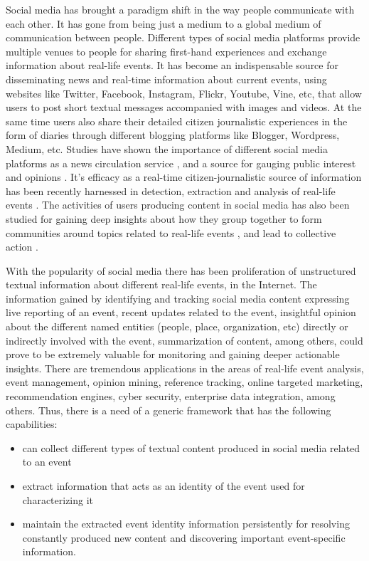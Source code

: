 \documentclass[11pt, oneside]{Thesis} %
\begin{document}
\maketitle

Social media has brought a paradigm shift in the way people communicate with each other. It has gone from being just a medium to a global medium of communication between people. Different types of social media platforms provide multiple venues to people for sharing first-hand experiences and exchange information about real-life events. It has become an indispensable source for disseminating news and real-time information about current events, using websites like Twitter, Facebook, Instagram, Flickr, Youtube, Vine, etc, that allow users to post short textual messages accompanied with images and videos. At the same time users also share their detailed citizen journalistic experiences in the form of diaries through different blogging platforms like Blogger, Wordpress, Medium, etc. Studies have shown the importance of different social media platforms as a news circulation service \cite{phelan2009using}, and a source for gauging public interest and opinions \cite{o2010tweets,singh2010clustering,singh2010mining,agarwal2012online}. It's efficacy as a real-time citizen-journalistic source of information has been recently harnessed in detection, extraction and analysis of real-life events \cite{sakaki2013tweet,popescu2011extracting,purohit2013twitris}. The activities of users producing content in social media has also been studied for gaining deep insights about how they group together to form communities around topics related to real-life events \cite{agarwal2013grouping,agarwal2014time,sen2012identifying}, and lead to collective action \cite{agarwal2014online,agarwal2012raising}.

With the popularity of social media there has been proliferation of unstructured textual information about different real-life events, in the Internet.
The information gained by identifying and tracking social media content expressing live reporting of an event, recent updates related to the event, insightful opinion about the different named entities (people, place, organization, etc) directly or indirectly involved with the event, summarization of content, among others, could prove to be extremely valuable for monitoring and gaining deeper actionable insights. There are tremendous applications in the areas of real-life event analysis, event management, opinion mining, reference tracking, online targeted marketing, recommendation engines, cyber security, enterprise data integration, among others. Thus, there is a need of a generic framework that has the following capabilities:
\begin{itemize}
\item can collect different types of textual content produced in social media related to an event
\item extract information that acts as an identity of the event used for characterizing it
\item maintain the extracted event identity information persistently for resolving constantly produced new content and discovering important event-specific information. 
\end{itemize}
\end{document}
